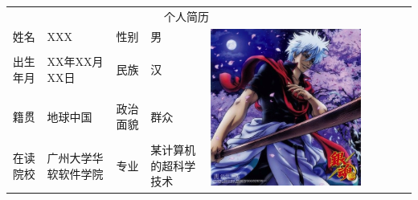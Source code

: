 \documentclass[11pt] {article}
\begin{document}
\begin{table}[!htbp]
	\centering
	\begin{tabular}{|c|l|c|l|c|l|c|l|c|}
	\hline
	\hline
		\multicolumn{5}{|c|}{\multirow{2}{*}{个人简历}}\\\multicolumn{5}{|c|}{}\\	
		\hline
		\multirow{2}{*}{姓名} & \multirow{2}{*}{XXX} &\multirow{2}{*}{性别}&\multirow{2}{*}{男} &\multirow{10}{*}{\includegraphics{MyPic.jpg} }\\
		&&&&\\
		\cline{1-4}
		\multirow{2}{*}{出生年月} & \multirow{2}{*}{XX年XX月XX日} &\multirow{2}{*}{民族}&\multirow{2}{*}{汉} &\\
		&&&&\\
		\cline{1-4}
		\multirow{2}{*}{籍贯} & \multirow{2}{*}{地球中国} &\multirow{2}{*}{政治面貌}&\multirow{2}{*}{群众} &\\
		&&&&\\
		\cline{1-4}
		\multirow{2}{*}{在读院校} & \multirow{2}{*}{广州大学华软软件学院} &\multirow{2}{*}{专业}&\multirow{2}{*}{某计算机的超科学技术} &\\

\end{tabular}
\end{table}
\end{document}
